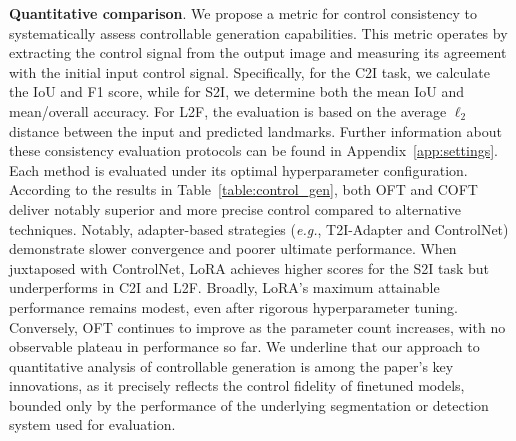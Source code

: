 \begin{itemize}[leftmargin=*,nosep]
\textbf{Quantitative comparison}. We propose a metric for control consistency to systematically assess controllable generation capabilities. This metric operates by extracting the control signal from the output image and measuring its agreement with the initial input control signal. Specifically, for the C2I task, we calculate the IoU and F1 score, while for S2I, we determine both the mean IoU and mean/overall accuracy. For L2F, the evaluation is based on the average $\ell_2$ distance between the input and predicted landmarks. Further information about these consistency evaluation protocols can be found in Appendix~\ref{app:settings}. Each method is evaluated under its optimal hyperparameter configuration. According to the results in Table~\ref{table:control_gen}, both OFT and COFT deliver notably superior and more precise control compared to alternative techniques. Notably, adapter-based strategies (\emph{e.g.}, T2I-Adapter and ControlNet) demonstrate slower convergence and poorer ultimate performance. When juxtaposed with ControlNet, LoRA achieves higher scores for the S2I task but underperforms in C2I and L2F. Broadly, LoRA's maximum attainable performance remains modest, even after rigorous hyperparameter tuning. Conversely, OFT continues to improve as the parameter count increases, with no observable plateau in performance so far. We underline that our approach to quantitative analysis of controllable generation is among the paper’s key innovations, as it precisely reflects the control fidelity of finetuned models, bounded only by the performance of the underlying segmentation or detection system used for evaluation.


\end{itemize}

